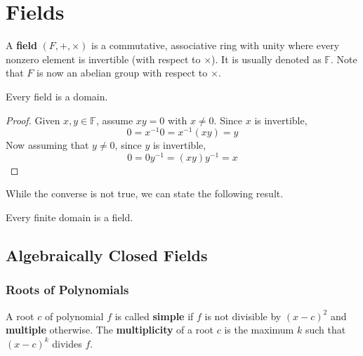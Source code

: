 \section{Fields}

  \begin{definition}[Field]
    A \textbf{field} $(F, +, \times)$ is a commutative, associative ring with unity where every nonzero element is invertible (with respect to $\times$). It is usually denoted as $\mathbb{F}$. Note that $F$ is now an abelian group with respect to $\times$. 
  \end{definition}

  \begin{proposition}
    Every field is a domain. 
  \end{proposition}
  \begin{proof}
    Given $x, y \in \mathbb{F}$, assume $x y = 0$ with $x \neq 0$. Since $x$ is invertible,
    \begin{equation}
      0 = x^{-1} 0 = x^{-1} (x y) = y
    \end{equation}
    Now assuming that $y \neq 0$, since $y$ is invertible, 
    \begin{equation}
      0 = 0 y^{-1} = (x y) y^{-1} = x
    \end{equation}
  \end{proof}

  While the converse is not true, we can state the following result. 

  \begin{theorem}
    Every finite domain is a field. 
  \end{theorem}

\subsection{Algebraically Closed Fields}

  \subsubsection{Roots of Polynomials}

    \begin{definition}
      A root $c$ of polynomial $f$ is called \textbf{simple} if $f$ is not divisible by $(x-c)^2$ and \textbf{multiple} otherwise. The \textbf{multiplicity} of a root $c$ is the maximum $k$ such that $(x-c)^k$ divides $f$. 
    \end{definition}

